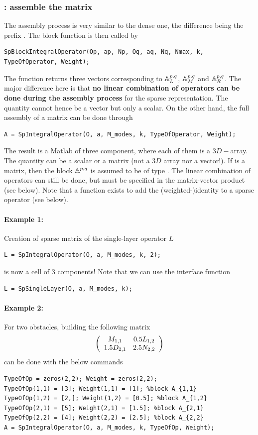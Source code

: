 \subsubsection{\mudiff: assemble the matrix}

The assembly process is very similar to the dense one, the difference being the prefix . The block function is then called by
\begin{lstlisting}
SpBlockIntegralOperator(Op, ap, Np, Oq, aq, Nq, Nmax, k, TypeOfOperator, Weight);
\end{lstlisting}
The function returns three vectors corresponding to ${\mathbb{A}}_L^{p,q}$, ${\mathbb{A}}_M^{p,q}$ and ${\mathbb{A}}_R^{p,q}$. The major difference here is that \textbf{no linear combination of operators can be done during the assembly process} for the sparse representation. The quantity  cannot hence be a vector but only a scalar. On the other hand, the full assembly of a matrix can be done through
\begin{lstlisting}
A = SpIntegralOperator(O, a, M_modes, k, TypeOfOperator, Weight);
\end{lstlisting}
The result is a Matlab  of three component, where each of them is a $3D-$array. The quantity  can be a scalar or a matrix (not a $3D$ array nor a vector!). If  is a matrix, then the block $\mathbb{A}^{p,q}$ is assumed to be of type . The linear combination of operators can still be done, but must be specified in the matrix-vector product (see below). Note that a function exists to add the (weighted-)identity to a sparse operator (see below).

\paragraph{Example 1:} Creation of \mudiff sparse matrix of the single-layer operator $L$
\begin{lstlisting}
L = SpIntegralOperator(O, a, M_modes, k, 2);
\end{lstlisting}
 is now a cell of $3$ components! Note that we can use the interface function
\begin{lstlisting}
L = SpSingleLayer(O, a, M_modes, k);
\end{lstlisting}
\paragraph{Example 2:} For two obstacles, building the following matrix 
$$
\left(\begin{array}{c c}
M_{1,1} & 0.5L_{1,2}\\
1.5D_{2,1} & 2.5N_{2,2}
\end{array}\right)
$$
can be done with the below commands
\begin{lstlisting}
TypeOfOp = zeros(2,2); Weight = zeros(2,2);
TypeOfOp(1,1) = [3]; Weight(1,1) = [1]; %block A_{1,1}
TypeOfOp(1,2) = [2,]; Weight(1,2) = [0.5]; %block A_{1,2}
TypeOfOp(2,1) = [5]; Weight(2,1) = [1.5]; %block A_{2,1}
TypeOfOp(2,2) = [4]; Weight(2,2) = [2.5]; %block A_{2,2}
A = SpIntegralOperator(O, a, M_modes, k, TypeOfOp, Weight);
\end{lstlisting}

